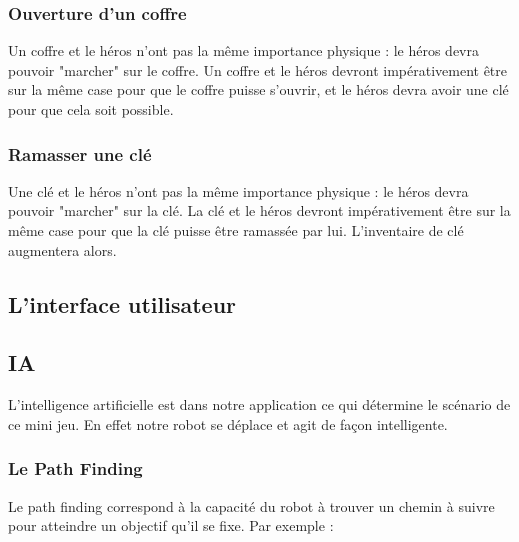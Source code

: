 \documentclass[a4paper 12pts]{article}
\begin{document}
\vspace{0.75cm}

\subsubsection {Ouverture d'un coffre}
Un coffre et le héros n'ont pas la même importance physique : le héros devra pouvoir "marcher" sur le coffre.
Un coffre et le héros devront impérativement être sur la même case pour que le coffre puisse s'ouvrir, et le héros devra avoir une clé pour que cela soit possible.


\vspace{0.75cm}

\subsubsection {Ramasser une clé}

\vspace{0.75cm}
Une clé et le héros n'ont pas la même importance physique : le héros devra pouvoir "marcher" sur la clé.
La clé et le héros devront impérativement être sur la même case pour que la clé puisse être ramassée par lui.
L'inventaire de clé augmentera alors.

\vspace{0.75cm} 
\subsection{L'interface utilisateur}

\subsection{IA}

L'intelligence artificielle est dans notre application ce qui détermine le scénario de ce mini jeu.
En effet notre robot se déplace et agit de façon intelligente.
\vspace{0.75cm}

\subsubsection{Le Path Finding}

\vspace{0.75cm}

Le path finding correspond à la capacité du robot à trouver un chemin à suivre pour atteindre un objectif qu'il se fixe.
Par exemple : 
\end{document}
